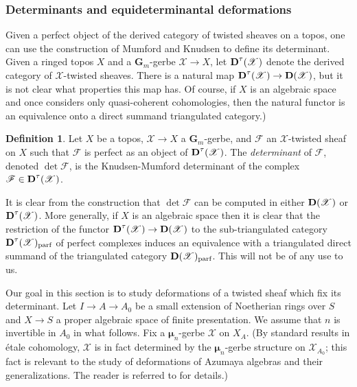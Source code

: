 \documentclass[11pt]{amsart}
\newcommand{\field}[1]{\mathbf #1}
\newcommand{\ms}[1]{\mathscr #1}
\newcommand{\m}{\boldsymbol{\mu}}
\newcommand{\G}{\field G} %
\DeclareMathOperator{\D}{\operatorname{\bf D}}
\renewcommand{\[}{[\!\hspace{0.03em}[}
\renewcommand{\]}{]\!\hspace{0.03em}]}
\renewcommand{\(}{(\!\hspace{0.03em}(}
\renewcommand{\)}{)\!\hspace{0.03em})}
\theoremstyle{definition}
\newtheorem{defn}[lem]{Definition}
\theoremstyle{remark}
\begin{document}
\subsubsection{Determinants and equideterminantal deformations}\label{S:equi}

Given a perfect object of the derived category of twisted sheaves on 
a topos, one can use the construction of Mumford and Knudsen 
\cite{mumford-knudsen} to define its determinant.  Given a ringed topos 
$X$ and a $\G_{m}$-gerbe $\ms X\to X$, let $\D^{\tau}(\ms X)$ denote 
the derived category of $\ms X$-twisted sheaves.  There is a natural 
map $\D^{\tau}(\ms X)\to\D(\ms X)$, but it is not clear what 
properties this map has.  Of course, if $X$ is an algebraic space and 
once considers only quasi-coherent cohomologies, then the natural 
functor is an equivalence onto a direct summand triangulated category.)

\begin{defn} Let $X$ be a topos, $\ms X\to X$ a $\G_{m}$-gerbe, and 
$\ms F$ an $\ms X$-twisted sheaf on $X$ such that $\ms F$ is perfect 
as an object of $\D^{\tau}(\ms X)$.  The \emph{determinant\/} of $\ms F$, 
denoted $\det\ms F$, is the Knudsen-Mumford determinant of the 
complex $\ms F\in\D^{\tau}(\ms X)$.
\end{defn}
It is clear from the construction that $\det\ms F$ can be computed in 
either $\D(\ms X)$ or $\D^{\tau}(\ms X)$.  More generally, if $X$ is 
an algebraic space then it is clear that the restriction of the functor $\D^{\tau}(\ms 
X)\to\D(\ms X)$ to the sub-triangulated category $\D^{\tau}(\ms 
X)_{\text{parf}}$ of perfect complexes 
induces an equivalence with a triangulated direct summand of the triangulated 
category $\D(\ms X)_{\text{parf}}$.  This will not be of any use to us.

Our goal in this section is to study deformations of a twisted sheaf 
which fix its determinant.  Let $I\to A\to A_{0}$ be a small 
extension of Noetherian rings over $S$ and $X\to S$ a proper algebraic 
space of finite presentation.  We assume 
that $n$ is invertible in $A_{0}$ in what follows.  Fix a 
$\m_{n}$-gerbe $\ms X$ on $X_{A}$.  (By standard results in \'etale 
cohomology, $\ms X$ is in fact determined by the $\m_{n}$-gerbe 
structure on $\ms X_{A_{0}}$; this fact is relevant to the study 
of deformations of Azumaya algebras and their generalizations.  The 
reader is referred to \cite{pgl-bundles} for details.)
\end{document}

